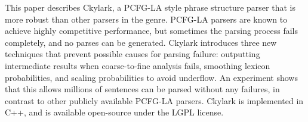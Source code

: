 This paper describes Ckylark, a PCFG-LA style phrase structure parser that is more robust than other parsers in the genre.  PCFG-LA parsers are known to achieve highly competitive performance, but sometimes the parsing process fails completely, and no parses can be generated.  Ckylark introduces three new techniques that prevent possible causes for parsing failure: outputting intermediate results when coarse-to-fine analysis fails, smoothing lexicon probabilities, and scaling probabilities to avoid underflow.  An experiment shows that this allows millions of sentences can be parsed without any failures, in contrast to other publicly available PCFG-LA parsers. Ckylark is implemented in C++, and is available open-source under the LGPL license.
